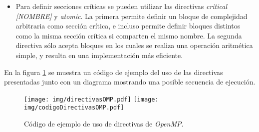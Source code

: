 \begin{itemize}
	\item	Para definir secciones críticas se pueden utilizar las directivas
		\emph{critical [NOMBRE]} y \emph{atomic}. La primera permite
		definir un bloque de complejidad arbitraria como sección
		crítica, e incluso permite definir bloques distintos como la
		misma sección crítica si comparten el mismo nombre. La segunda
		directiva sólo acepta bloques en los cuales se realiza una
		operación aritmética simple, y resulta en una implementación
		más eficiente.

\end{itemize}

En la figura \ref{directivas} se muestra un código de ejemplo del uso de las
directivas presentadas junto con un diagrama mostrando una posible secuencia
de ejecución.

\begin{figure}[!htb]

	\centering

	\texttt{[image: img/directivasOMP.pdf]}
	\texttt{[image: img/codigoDirectivasOMP.pdf]}

	\caption{Código de ejemplo de uso de directivas de \emph{OpenMP}.}

	\label{directivas}

\end{figure}
